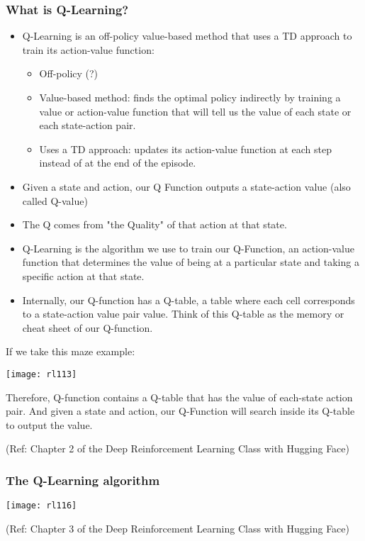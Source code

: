 \begin{frame}[fragile]\frametitle{What is Q-Learning?}

\begin{itemize}

\item Q-Learning is an off-policy value-based method that uses a TD approach to train its action-value function:


\begin{itemize}
\item Off-policy (?)
\item Value-based method: finds the optimal policy indirectly by training a value or action-value function that will tell us the value of each state or each state-action pair.
\item Uses a TD approach: updates its action-value function at each step instead of at the end of the episode.
\end{itemize}

\item Given a state and action, our Q Function outputs a state-action value (also called Q-value)
\item The Q comes from "the Quality" of that action at that state.
\item Q-Learning is the algorithm we use to train our Q-Function, an action-value function that determines the value of being at a particular state and taking a specific action at that state.
\item Internally, our Q-function has a Q-table, a table where each cell corresponds to a state-action value pair value. Think of this Q-table as the memory or cheat sheet of our Q-function.
\end{itemize}


If we take this maze example:
\begin{center}
\texttt{[image: rl113]}
\end{center}

Therefore, Q-function contains a Q-table that has the value of each-state action pair. And given a state and action, our Q-Function will search inside its Q-table to output the value.

{\tiny (Ref: Chapter 2 of the Deep Reinforcement Learning Class with Hugging Face)}

\end{frame}

\begin{frame}[fragile]\frametitle{The Q-Learning algorithm}


\begin{center}
\texttt{[image: rl116]}
\end{center}

{\tiny (Ref: Chapter 3 of the Deep Reinforcement Learning Class with Hugging Face)}

\end{frame}

